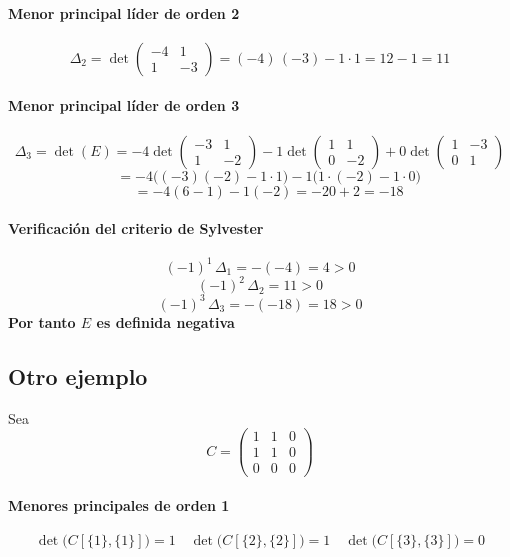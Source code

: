 \documentclass{article}
\begin{document}
\paragraph*{Menor principal líder de orden 2}  
\[
\Delta_2 = \det\begin{pmatrix}
-4 & 1\\
1 & -3
\end{pmatrix}
= (-4)\,(-3) - 1\cdot1
= 12 - 1
= 11
\]

\paragraph*{Menor principal líder de orden 3}  
\[
\Delta_3 = \det(E)
= -4\det\begin{pmatrix}-3 & 1\\1 & -2\end{pmatrix}
- 1\det\begin{pmatrix}1 & 1\\0 & -2\end{pmatrix}
+ 0\det\begin{pmatrix}1 & -3\\0 & 1\end{pmatrix}
\]
\[
\phantom{\Delta_3}
= -4\bigl((-3)(-2) - 1\cdot1\bigr)
- 1\bigl(1\cdot(-2) - 1\cdot0\bigr)
\]
\[
\phantom{\Delta_3}
= -4(6 - 1) - 1(-2)
= -20 + 2
= -18
\]

\paragraph*{Verificación del criterio de Sylvester}  
\[
(-1)^1\,\Delta_1 = -(-4) = 4 > 0
\]
\[
(-1)^2\,\Delta_2 = 11 > 0
\]
\[
(-1)^3\,\Delta_3 = -(-18) = 18 > 0
\]
\textbf{\color{teal}Por tanto \(E\) es definida negativa  
}
\subsection*{Otro ejemplo}

Sea  
\[
C = \begin{pmatrix}
1 & 1 & 0\\
1 & 1 & 0\\
0 & 0 & 0
\end{pmatrix}
\]

\paragraph*{Menores principales de orden 1}  
\[
\det\bigl(C[\{1\},\{1\}]\bigr)=1
\quad
\det\bigl(C[\{2\},\{2\}]\bigr)=1
\quad
\det\bigl(C[\{3\},\{3\}]\bigr)=0
\]
\end{document}
